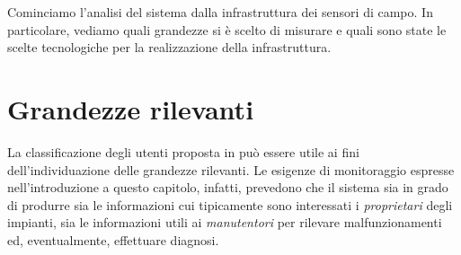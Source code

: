 %
Cominciamo l'analisi del sistema dalla infrastruttura dei sensori di campo.
%
In particolare, vediamo quali grandezze si \`e scelto di misurare e quali sono
state le scelte tecnologiche per la realizzazione della infrastruttura.
%

%
\section{Grandezze rilevanti}
\label{sec:grandezze-rilevanti}
%
La classificazione degli utenti proposta in \cite{kolodenny08} pu\`o essere utile ai 
fini dell'individuazione delle grandezze rilevanti. Le esigenze di monitoraggio 
espresse nell'introduzione a questo capitolo, infatti, prevedono che il sistema 
sia in grado di produrre sia le informazioni cui tipicamente sono interessati i 
\emph{proprietari} degli impianti, sia le informazioni utili ai \emph{manutentori} 
per rilevare malfunzionamenti ed, eventualmente, effettuare diagnosi.
%

